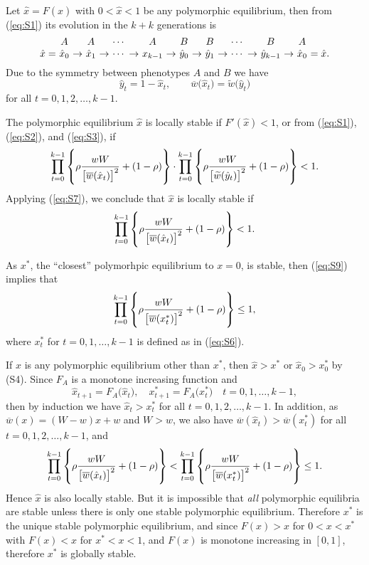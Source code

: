 \documentclass[9pt, a4paper]{extarticle}
\begin{document}
Let $\hat x=F(\hat x)$ with $0<\hat x<1$ be any polymorphic equilibrium, then from (\ref{eq:S1}) its evolution in the $k+k$ generations is 
\begin{equation}
\vbox{\halign{
\hfil$#$\hfil &&\hfil\ $#$\hfil\cr
&A&&A&&\cdots&&A&&B&&B&&\cdots&&B&&A\cr
\hat x=&\hat x_0&\to&\hat x_1&\to&\cdots&\to&x_{k-1}&\to&\hat y_0&\to&\hat y_1&\to&\cdots&\to&\hat y_{k-1}&\to&\hat x_0&=\hat x.\cr
}}
\label{eq:S6}
\end{equation}
Due to the symmetry between phenotypes $A$ and $B$ we have
\begin{equation}
\hat y_t=1-\hat x_t,\qquad \overline w\bigl(\hat x_t\bigr) =\widetilde w\bigl(\hat y_t\bigr)
\label{eq:S7}
\end{equation}
for all $t=0,1,2,\dots,k-1$.

The polymorphic equilibrium $\hat x$ is locally stable if $F'(\hat x)<1$, or from (\ref{eq:S1}), (\ref{eq:S2}), and (\ref{eq:S3}), if
\begin{equation}
\prod_{t=0}^{k-1}\left\{\rho{wW\over\bigl[\overline w(\hat x_t)\bigr]^2} +(1-\rho)\right\}\cdot\prod_{t=0}^{k-1} \left\{\rho{wW\over\bigl[\widetilde w(\hat y_t)\bigr]^2} +(1-\rho)\right\}<1.
\end{equation}
Applying (\ref{eq:S7}), we conclude that $\hat x$ is locally stable if
\begin{equation}
\prod_{t=0}^{k-1}\left\{\rho{wW\over\bigl[\overline w(\hat x_t)\bigr]^2} +(1-\rho)\right\}<1.
\label{eq:S9}
\end{equation}

As $x^*$, the ``closest'' polymorhpic equilibrium to $x=0$, is stable, then (\ref{eq:S9}) implies that
\begin{equation}
\prod_{t=0}^{k-1}\left\{\rho{wW\over\bigl[\overline w(x_t^*)\bigr]^2} +(1-\rho)\right\}\le 1,
\end{equation}
 where $x_t^*$ for $t=0,1,\dots,k-1$ is defined as in (\ref{eq:S6}).
 
 If $\hat x$ is any  polymorphic equilibrium other than $x^*$, then $\hat x>x^*$ or $\hat x_0>x_0^*$ by (S4). Since $F_A$ is a monotone increasing function and
\begin{equation}
\hat x_{t+1} =F_A\bigl(\hat x_t\bigr),\quad x_{t+1}^* =F_A\bigl(x_t^*\bigr)\quad t=0,1,\dots,k-1,
\end{equation}
 then by induction we have $\hat x_t>x_t^*$ for all $t=0,1,2,\dots,k-1$. In addition, as $\overline w(x) =(W-w)x+w$ and $W>w$, we also have $\overline w(\hat x_t)>\overline w(x_t^*)$ for all $t=0,1,2,\dots,k-1$, and
 \begin{equation}
\prod_{t=0}^{k-1}\left\{\rho{wW\over\bigl[\overline w(\hat x_t)\bigr]^2} +(1-\rho)\right\}<\prod_{t=0}^{k-1} \left\{\rho{wW\over\bigl[\overline w(x_t^*)\bigr]^2} +(1-\rho)\right\}\le 1.
 \end{equation}
Hence $\hat x$ is also locally stable.
But it is impossible that {\sl all} polymorphic equilibria are stable unless there is only one stable polymorphic equilibrium. Therefore $x^*$ is the unique stable polymorphic equilibrium, and since $F(x)>x$ for $0<x<x^*$ with $F(x)<x$ for $x^*<x<1$, and $F(x)$ is monotone increasing in $[0,1]$, therefore $x^*$ is globally stable.
\end{document}
